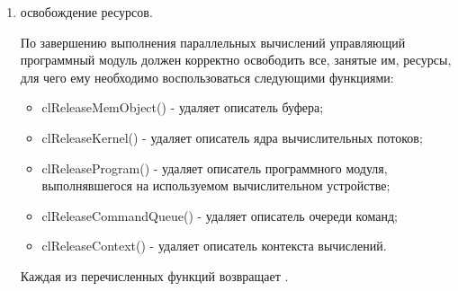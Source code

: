 \begin{enumerate}

		\item освобождение ресурсов.

			По завершению выполнения параллельных вычислений управляющий программный модуль должен корректно освободить все, занятые им, ресурсы, для чего ему необходимо воспользоваться следующими функциями:

			\newcommand{\openclfirstrelease}[2]{\item clRelease#1() - удаляет описатель #2, переданный в функцию первым и единственным параметром}
			\newcommand{\openclrelease}[2]{\item clRelease#1() - удаляет описатель #2}

			\begin{itemize}

				\openclrelease{MemObject}{буфера};
				\openclrelease{Kernel}{ядра вычислительных потоков};
				\openclrelease{Program}{программного модуля, выполнявшегося на используемом вычислительном устройстве};
				\openclrelease{CommandQueue}{очереди команд};
				\openclrelease{Context}{контекста вычислений}.

			\end{itemize}

			Каждая из перечисленных функций возвращает \openclsuccess.


\end{enumerate}

